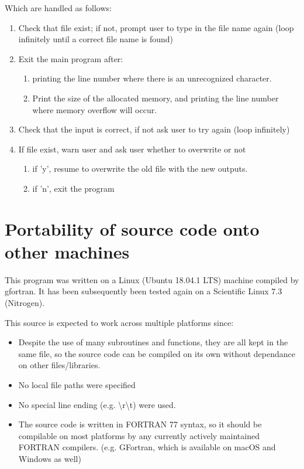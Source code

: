 \documentclass[a4paper, 12pt]{article}
\begin{document}
Which are handled as follows:
\begin{enumerate}
	\item Check that file exist; if not, prompt user to type in the file name again (loop infinitely until a correct file name is found)
	\item Exit the main program after:
	\begin{enumerate}
		\item printing the line number where there is an unrecognized character.
		\item Print the size of the allocated memory, and printing the line number where memory overflow will occur.
	\end{enumerate}
	\item Check that the input is correct, if not ask user to try again (loop infinitely)
	\item If file exist, warn user and ask user whether to overwrite or not
	\begin{enumerate}
		\item if 'y', resume to overwrite the old file with the new outputs.
		\item if 'n', exit the program
	\end{enumerate}
\end  {enumerate}

\section{Portability of source code onto other machines}
This program was written on a Linux (Ubuntu 18.04.1 LTS) machine compiled by gfortran. It has been subsequently been tested again on a Scientific Linux 7.3 (Nitrogen).

This source is expected to work across multiple platforms since:
\begin{itemize}
	\item Despite the use of many subroutines and functions, they are all kept in the same file, so the source code can be compiled on its own without dependance on other files/libraries.
	\item No local file paths were specified
	\item No special line ending (e.g. \textbackslash r\textbackslash t) were used.
	\item The source code is written in FORTRAN 77 syntax, so it should be compilable on most platforms by any currently actively maintained FORTRAN compilers. (e.g. GFortran, which is available on macOS and Windows as well)
\end{itemize}
\end{document}
